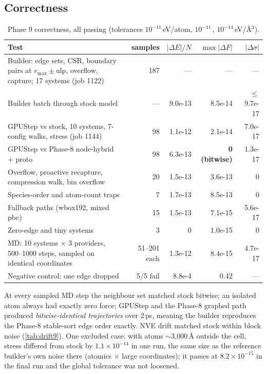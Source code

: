 \subsection{Correctness}
\begin{table}[h]
\centering
\caption{Phase 9 correctness, all passing (tolerances $10^{-11}$\,eV/atom, $10^{-11}$\,\eVA, $10^{-14}$\,eV/\AA$^3$).}
\label{tab:corr9}
\small
\begin{tabular}{p{6.4cm}rrrr}
\toprule
Test & samples & $|\Delta E|/N$ & $\max|\Delta F|$ & $|\Delta\sigma|$ \\
\midrule
Builder: edge sets, CSR, boundary pairs at $r_{\max}\pm$ulp, overflow, capture; 17 systems (job 1122) & 187 & --- & --- & --- \\
Builder batch through stock model & --- & 9.0e-13 & 8.5e-14 & $\le$9.7e-17 \\
GPUStep vs stock, 10 systems, 7-config walks, stress (job 1144) & 98 & 1.1e-12 & 2.1e-14 & 7.0e-17 \\
GPUStep vs Phase-8 node-hybrid + proto & 98 & 6.3e-13 & \textbf{0 (bitwise)} & 1.3e-17 \\
Overflow, proactive recapture, compression walk, bin overflow & 20 & 1.5e-13 & 3.6e-13 & 0 \\
Species-order and atom-count traps & 7 & 1.7e-13 & 8.5e-13 & 0 \\
Fallback paths (wbox192, mixed pbc) & 15 & 1.5e-13 & 7.1e-15 & 5.6e-17 \\
Zero-edge and tiny systems & 3 & 0 & 1.0e-15 & 0 \\
MD: 10 systems $\times$ 3 providers, 500--1000 steps, sampled on identical coordinates & 51--201 each & 1.3e-12 & 8.4e-15 & 4.7e-17 \\
Negative control: one edge dropped & 5/5 fail & 8.8e-4 & 0.42 & --- \\
\bottomrule
\end{tabular}
\end{table}

At every sampled MD step the neighbour set matched stock bitwise; an isolated atom always had exactly zero force; GPUStep and the Phase-8 graphed path produced \emph{bitwise-identical trajectories} over 2\,ps, meaning the builder reproduces the Phase-8 stable-sort edge order exactly. NVE drift matched stock within block noise (\cref{tab:drift9}). One excluded case: with atoms $\sim$3{,}000\,\AA{} outside the cell, stress differed from stock by $1.1\times10^{-14}$ in one run, the same size as the reference builder's own noise there (atomics $\times$ large coordinates); it passes at $8.2\times10^{-15}$ in the final run and the global tolerance was not loosened.

